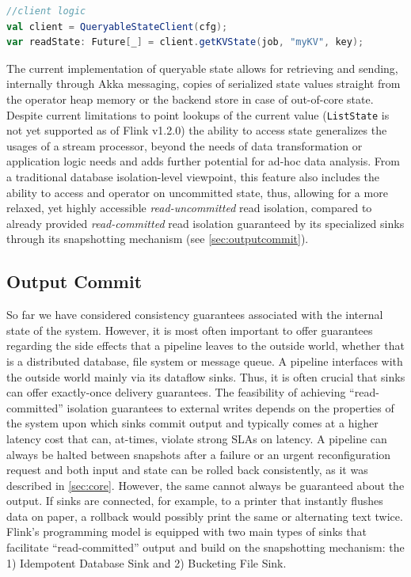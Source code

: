 \begin{lstlisting}[language=scala]
//client logic
val client = QueryableStateClient(cfg);
var readState: Future[_] = client.getKVState(job, "myKV", key);
\end{lstlisting}
The current implementation of queryable state allows for retrieving and sending, internally through Akka messaging, copies of serialized state values straight from the operator heap memory or the backend store in case of out-of-core state. Despite current limitations to point lookups of the current value (\texttt{ListState} is not yet supported as of Flink v1.2.0) the ability to access state generalizes the usages of a stream processor, beyond the needs of data transformation or application logic needs and adds further potential for ad-hoc data analysis. From a traditional database isolation-level viewpoint, this feature also includes the ability to access and operator on uncommitted state, thus, allowing for a more relaxed, yet highly accessible \emph{read-uncommitted} read isolation, compared to already provided \emph{read-committed} read isolation guaranteed by its specialized sinks through its snapshotting mechanism (see \autoref{sec:outputcommit}). 

\subsection{Output Commit}
\label{sec:outputcommit}

So far we have considered consistency guarantees associated with the internal state of the system. However, it is most often important to offer guarantees regarding the side effects that a pipeline leaves to the outside world, whether that is a distributed database, file system or message queue. A pipeline interfaces with the outside world mainly via its dataflow sinks. Thus, it is often crucial that sinks can offer exactly-once delivery guarantees. The feasibility of achieving ``read-committed'' isolation guarantees to external writes depends on the properties of the system upon which sinks commit output and typically comes at a higher latency cost that can, at-times, violate strong SLAs on latency. A pipeline can always be halted between snapshots after a failure or an urgent reconfiguration request and both input and state can be rolled back consistently, as it was described in \ref{sec:core}. However, the same cannot always be guaranteed about the output. If sinks are connected, for example, to a printer that instantly flushes data on paper, a rollback would possibly print the same or alternating text twice. Flink's programming model is equipped with two main types of sinks that facilitate ``read-committed'' output and build on the snapshotting mechanism: the 1) Idempotent Database Sink and 2) Bucketing File Sink.

